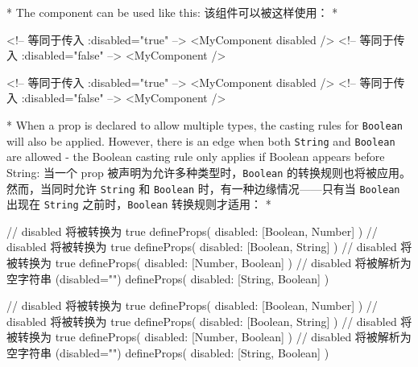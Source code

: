 \begin{paracol}{2}
\switchcolumn[0]*%
The component can be used like this:
\switchcolumn
该组件可以被这样使用：
\switchcolumn[0]*%
\begin{codeHtml}
<!-- 等同于传入 :disabled="true" -->
<MyComponent disabled />
<!-- 等同于传入 :disabled="false" -->
<MyComponent />
\end{codeHtml}
\switchcolumn
\begin{codeHtml}
<!-- 等同于传入 :disabled="true" -->
<MyComponent disabled />
<!-- 等同于传入 :disabled="false" -->
<MyComponent />
\end{codeHtml}
\switchcolumn[0]*%
When a prop is declared to allow multiple types, the casting rules for
\texttt{Boolean} will also be applied. However, there is an edge when
both \texttt{String} and \texttt{Boolean} are allowed - the Boolean
casting rule only applies if Boolean appears before String:
\switchcolumn
当一个 prop 被声明为允许多种类型时，\texttt{Boolean}
的转换规则也将被应用。然而，当同时允许 \texttt{String} 和
\texttt{Boolean} 时，有一种边缘情况------只有当 \texttt{Boolean} 出现在
\texttt{String} 之前时，\texttt{Boolean} 转换规则才适用：
\switchcolumn[0]*%
\begin{codeJs}
// disabled 将被转换为 true
defineProps({
  disabled: [Boolean, Number]
})
// disabled 将被转换为 true
defineProps({
  disabled: [Boolean, String]
})
// disabled 将被转换为 true
defineProps({
  disabled: [Number, Boolean]
})
// disabled 将被解析为空字符串 (disabled="")
defineProps({
  disabled: [String, Boolean]
})
\end{codeJs}
\switchcolumn
\begin{codeJs}
// disabled 将被转换为 true
defineProps({
  disabled: [Boolean, Number]
})
// disabled 将被转换为 true
defineProps({
  disabled: [Boolean, String]
})
// disabled 将被转换为 true
defineProps({
  disabled: [Number, Boolean]
})
// disabled 将被解析为空字符串 (disabled="")
defineProps({
  disabled: [String, Boolean]
})
\end{codeJs}
\end{paracol} 


